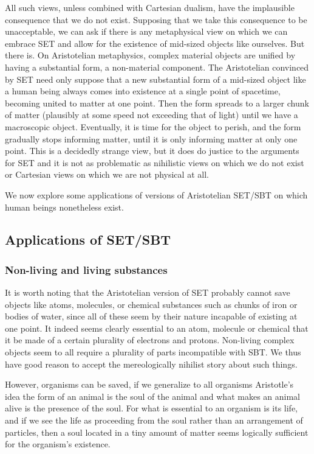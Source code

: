 All such views, unless combined with Cartesian dualism, have the implausible consequence that we do not exist. Supposing that we take this consequence to be unacceptable, we can ask if there is any metaphysical view on which we can embrace SET and allow for the existence of mid-sized objects like ourselves. But there is. On Aristotelian metaphysics, complex material objects are unified by having a substantial form, a non-material component. The Aristotelian convinced by SET need only suppose that a new substantial form of a mid-sized object like a human being always comes into existence at a single point of spacetime, becoming united to matter at one point. Then the form spreads to a larger chunk of matter (plausibly at some speed not exceeding that of light) until we have a macroscopic object. Eventually, it is time for the object to perish, and the form gradually stops informing matter, until it is only informing matter at only one point. This is a decidedly strange view, but it does do justice to the arguments for SET and it is not as problematic as nihilistic views on which we do not exist or Cartesian views on which we are not physical at all. 

We now explore some applications of versions of Aristotelian SET/SBT on which human beings nonetheless exist.

\subsection{Applications of SET/SBT}
\subsubsection{Non-living and living substances}\label{sec:living}
It is worth noting that the Aristotelian version of SET probably cannot save objects like atoms, molecules, 
or chemical substances such as chunks of iron or bodies of water, since all of these seem by their 
nature incapable of existing 
at one point. It indeed seems clearly essential
to an atom, molecule or chemical that it be made of a certain plurality of electrons and protons. Non-living
complex objects seem to all require a plurality of parts incompatible with SBT. We thus have good reason to
accept the mereologically nihilist story about such things.

However, organisms can be saved, if we generalize to all organisms Aristotle's idea the form of an animal 
is the soul of the animal and what makes an animal alive is the presence of the soul. For what is essential
to an organism is its life, and if we see the life as proceeding from the soul rather than an arrangement
of particles, then a soul located in a tiny amount of matter seems logically sufficient for the organism's
existence.

